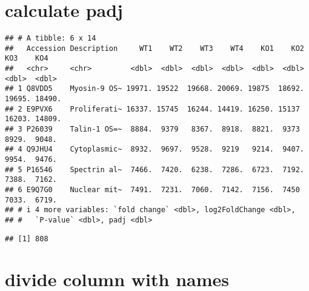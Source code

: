 \documentclass[
]{article}
\newenvironment{Shaded}{\begin{snugshade}}{\end{snugshade}}
\newcommand{\AttributeTok}[1]{\textcolor[rgb]{0.13,0.29,0.53}{#1}}
\newcommand{\FloatTok}[1]{\textcolor[rgb]{0.00,0.00,0.81}{#1}}
\newcommand{\FunctionTok}[1]{\textcolor[rgb]{0.13,0.29,0.53}{\textbf{#1}}}
\newcommand{\NormalTok}[1]{#1}
\newcommand{\OtherTok}[1]{\textcolor[rgb]{0.56,0.35,0.01}{#1}}
\newcommand{\SpecialCharTok}[1]{\textcolor[rgb]{0.81,0.36,0.00}{\textbf{#1}}}
\newcommand{\StringTok}[1]{\textcolor[rgb]{0.31,0.60,0.02}{#1}}
\begin{document}
\hypertarget{calculate-padj}{%
\section{calculate padj}\label{calculate-padj}}

\begin{Shaded}
\end{Shaded}

\begin{verbatim}
## # A tibble: 6 x 14
##   Accession Description     WT1    WT2    WT3    WT4    KO1    KO2    KO3    KO4
##   <chr>     <chr>         <dbl>  <dbl>  <dbl>  <dbl>  <dbl>  <dbl>  <dbl>  <dbl>
## 1 Q8VDD5    Myosin-9 OS~ 19971. 19522  19668. 20069. 19875  18692. 19695. 18490.
## 2 E9PVX6    Proliferati~ 16337. 15745  16244. 14419. 16250. 15137  16203. 14809.
## 3 P26039    Talin-1 OS=~  8884.  9379   8367.  8918.  8821.  9373   8929.  9048.
## 4 Q9JHU4    Cytoplasmic~  8932.  9697.  9528.  9219   9214.  9407.  9954.  9476.
## 5 P16546    Spectrin al~  7466.  7420.  6238.  7286.  6723.  7192.  7388.  7162.
## 6 E9Q7G0    Nuclear mit~  7491.  7231.  7060.  7142.  7156.  7450   7033.  6719.
## # i 4 more variables: `fold change` <dbl>, log2FoldChange <dbl>,
## #   `P-value` <dbl>, padj <dbl>
\end{verbatim}

\begin{Shaded}
\end{Shaded}

\begin{verbatim}
## [1] 808
\end{verbatim}

\hypertarget{divide-column-with-names}{%
\section{divide column with names}\label{divide-column-with-names}}
\end{document}
